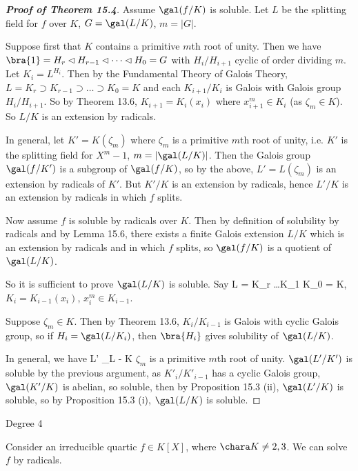 \begin{proof}[\bf Proof of Theorem 15.4]
Assume $\gal(f/K)$ is soluble. Let $L$ be the splitting field for $f$ over $K$, $G = \gal(L/K)$, $m = |G|$.

Suppose first that $K$ contains a primitive $m$th root of unity. Then we have $\bra{1} = H_r \lhd H_{r-1} \lhd \dots \lhd H_0 = G$ with $H_i/H_{i+1}$ cyclic of order dividing $m$. Let $K_i = L^{H_i}$. Then by the Fundamental Theory of Galois Theory, $L = K_r \supset K_{r-1} \supset \dots \supset K_0 = K$ and each $K_{i+1}/K_i$ is Galois with Galois group $H_i/H_{i+1}$. So by Theorem 13.6, $K_{i+1} = K_i(x_i)$ where $x^m_{i+1} \in K_i$ (as $\zeta_m \in K$). So $L/K$ is an extension by radicals.

In general, let $K' = K(\zeta_m)$ where $\zeta_m$ is a primitive $m$th root of unity, i.e. $K'$ is the splitting field for $X^m - 1$, $m = |\gal(L/K)|$. Then the Galois group $\gal(f/K')$ is a subgroup of $\gal(f/K)$, so by the above, $L' = L(\zeta_m)$ is an extension by radicals of $K'$. But $K'/K$ is an extension by radicals, hence $L'/K$ is an extension by radicals in which $f$ splits.

Now assume $f$ is soluble by radicals over $K$. Then by definition of solubility by radicals and by Lemma 15.6, there exists a finite Galois extension $L/K$ which is an extension by radicals and in which $f$ splits, so $\gal(f/K)$ is a quotient of $\gal(L/K)$.

So it is sufficient to prove $\gal(L/K)$ is soluble. Say 
\be
L = K_r \supset \dots\supset K_1 \supset K_0 = K,
\ee
$K_i = K_{i-1}(x_i)$, $x^m_i \in K_{i-1}$.

Suppose $\zeta_m \in K$. Then by Theorem 13.6, $K_i/K_{i-1}$ is Galois with cyclic Galois group, so if $H_i = \gal(L/K_i)$, then $\bra{H_i}$ gives solubility of $\gal(L/K)$.

In general, we have
\be
L' _{L} - K
\ee
$\zeta_m$ is a primitive $m$th root of unity. $\gal(L'/K')$ is soluble by the previous argument, as $K'_i/K'_{i-1}$ has a cyclic Galois group, $\gal(K'/K)$ is abelian, so soluble, then by Proposition 15.3 (ii), $\gal(L'/K)$ is soluble, so by Proposition 15.3 (i), $\gal(L/K)$ is soluble.
\end{proof}


Degree 4

Consider an irreducible quartic $f \in K[X]$, where $\chara K \neq  2, 3$. We can solve $f$ by radicals.

